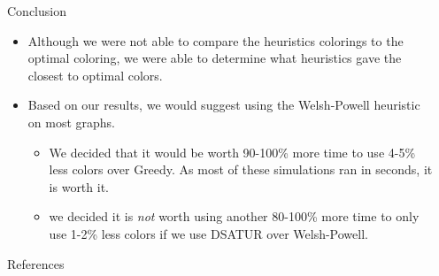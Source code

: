 \documentclass[final]{beamer}
\newlength{\sepwid}
\newlength{\onecolwid}
\begin{document}
\begin{frame}[t]
\begin{columns}[t]
\begin{column}{\onecolwid}
    \begin{block}{Conclusion}
      \begin{itemize}
        \item Although we were not able to compare the heuristics colorings to the optimal coloring, we were able to determine what heuristics gave the closest to optimal colors.
        \item Based on our results, we would suggest using the Welsh-Powell heuristic on most graphs.
        \begin{itemize}
          \item We decided that it would be worth 90-100\% more time to use 4-5\% less colors over Greedy. As most of these simulations ran in seconds, it is worth it.
          \item we decided it is \emph{not} worth using another 80-100\% more time to only use 1-2\% less colors if we use DSATUR over Welsh-Powell.
        \end{itemize}
      \end{itemize}
    \end{block}

    \begin{block}{References}
      \small{}
    \end{block}

  \end{column}
  \begin{column}{\sepwid}\end{column}			%
 \end{columns}
\end{frame}
\end{document}

